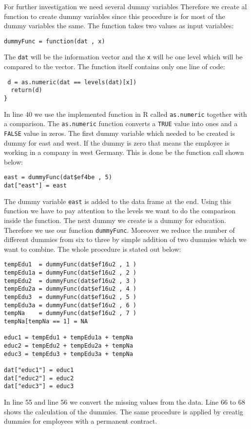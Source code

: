 For further investigation we need several dummy variables Therefore we create al function to create dummy variables since this procedure is for most of the dummy variables the same. The function takes two values as input variables:
\lstset{firstnumber = 43}
\begin{lstlisting}
dummyFunc = function(dat , x)
\end{lstlisting}
The \texttt{dat} will be the information vector and the \texttt{x} will be one level which will be compared to the vector. The function itself contains only one line of code:
\lstset{firstnumber = 40}
\begin{lstlisting}
 d = as.numeric(dat == levels(dat)[x])      
  return(d)
}
\end{lstlisting}
In line 40 we use the implemented function in R called \texttt{as.numeric} together with a comparison. The \texttt{as.numeric} function converts a \texttt{TRUE} value into ones and a \texttt{FALSE} value in zeros. The first dummy variable which needed to be created is dummy for east and west. If the dummy is zero that means the employee is working in a company in west Germany. This is done be the function call shown below:
\lstset{firstnumber = 45}
\begin{lstlisting}
east = dummyFunc(dat$ef4be , 5)
dat["east"] = east       
\end{lstlisting}
The dummy variable \texttt{east} is added to the data frame at the end. Using this function we have to pay attention to the levels we want to do the comparison inside the function. The next dummy we create is a dummy for education. Therefore we use our function \texttt{dummyFunc}. Moreover we reduce the number of different dummies from six to three by simple addition of two dummies which we want to combine. The whole procedure is stated out below:
\lstset{firstnumber = 49}
\begin{lstlisting}
tempEdu1  = dummyFunc(dat$ef16u2 , 1 )
tempEdu1a = dummyFunc(dat$ef16u2 , 2 )
tempEdu2  = dummyFunc(dat$ef16u2 , 3 )
tempEdu2a = dummyFunc(dat$ef16u2 , 4 )
tempEdu3  = dummyFunc(dat$ef16u2 , 5 )
tempEdu3a = dummyFunc(dat$ef16u2 , 6 )
tempNa    = dummyFunc(dat$ef16u2 , 7 )
tempNa[tempNa == 1] = NA                

educ1 = tempEdu1 + tempEdu1a + tempNa
educ2 = tempEdu2 + tempEdu2a + tempNa
educ3 = tempEdu3 + tempEdu3a + tempNa

dat["educ1"] = educ1                   
dat["educ2"] = educ2
dat["educ3"] = educ3  
\end{lstlisting}
In line 55 and line 56 we convert the missing values from the data. Line 66 to 68 shows the calculation of the dummies. The same procedure is applied by creatig dummies for employees with a permanent contract.
